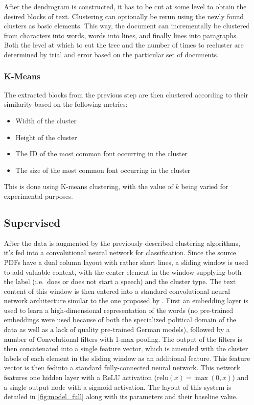 After the dendrogram is constructed, it has to be cut at some level to obtain
the desired blocks of text. Clustering can optionally be rerun using the newly
found clusters as basic elements. This way, the document can incrementally be
clustered from characters into words, words into lines, and finally lines into
paragraphs. Both the level at which to cut the tree and the number of times to
recluster are determined by trial and error based on the particular set of
documents.

\subsubsection{K-Means}
The extracted blocks from the previous step are then clustered according to
their similarity based on the following metrics:
\begin{itemize}
  \item Width of the cluster
  \item Height of the cluster
  \item The ID of the most common font occurring in the cluster
  \item The size of the most common font occurring in the cluster
\end{itemize}
This is done using K-means clustering, with the value of $k$ being varied for
experimental purposes.

\subsection{Supervised}%
\label{sec:sup}
After the data is augmented by the previously described clustering algorithms,
it's fed into a convolutional neural network for classification. Since the
source PDFs have a dual column layout with rather short lines, a sliding window
is used to add valuable context, with the center element in the window supplying
both the label (i.e.\ does or does not start a speech) and the cluster type. The
text content of this window is then entered into a standard convolutional neural
network architecture similar to the one proposed by \textcite{kim2014conv}.
First an embedding layer is used to learn a high-dimensional representation of
the words (no pre-trained embeddings were used because of both the specialized
political domain of the data as well as a lack of quality pre-trained German models),
followed by a number of Convolutional filters with 1-max pooling. The output of
the filters is then concatenated into a single feature vector, which is amended 
with the cluster labels of each element in the sliding window as an additional
feature. This feature vector is then fedinto a standard fully-connected neural
network. This network features one hidden layer with a ReLU activation
($\mathrm{relu}(x) = \max(0, x)$) and a single output node with a sigmoid
activation. The layout of this system is detailed in \cref{fig:model_full} along
with its parameters and their baseline value.

